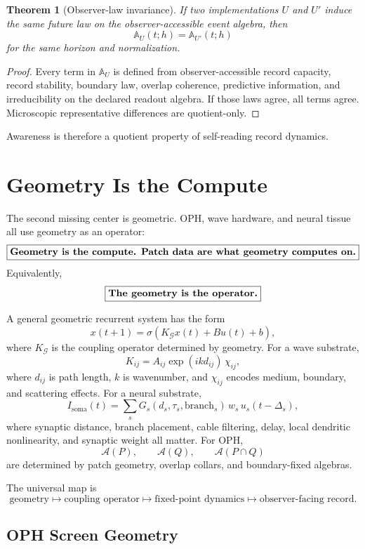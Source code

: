 \documentclass[11pt]{article}
\newtheorem{theorem}{Theorem}[section]
\theoremstyle{remark}
\theoremstyle{plain}
\begin{document}
\begin{theorem}[Observer-law invariance]
If two implementations \(U\) and \(U'\) induce the same future law on the observer-accessible event algebra, then
\[
\mathbb A_U(t;h)=\mathbb A_{U'}(t;h)
\]
for the same horizon and normalization.
\end{theorem}

\begin{proof}
Every term in \(\mathbb A_U\) is defined from observer-accessible record capacity, record stability, boundary law, overlap coherence, predictive information, and irreducibility on the declared readout algebra. If those laws agree, all terms agree. Microscopic representative differences are quotient-only.
\end{proof}

Awareness is therefore a quotient property of self-reading record dynamics.

\section{Geometry Is the Compute}

The second missing center is geometric. OPH, wave hardware, and neural tissue all use geometry as an operator:
\[
\boxed{
\text{\bfseries Geometry is the compute. Patch data are what geometry computes on.}
}
\]
Equivalently,
\[
\boxed{
\text{\bfseries The geometry is the operator.}
}
\]

A general geometric recurrent system has the form
\[
x(t+1)=\sigma\!\left(K_{\mathcal G}x(t)+Bu(t)+b\right),
\]
where \(K_{\mathcal G}\) is the coupling operator determined by geometry. For a wave substrate,
\[
K_{ij}=A_{ij}\exp(i k d_{ij})\,\chi_{ij},
\]
where \(d_{ij}\) is path length, \(k\) is wavenumber, and \(\chi_{ij}\) encodes medium, boundary, and scattering effects. For a neural substrate,
\[
I_{\mathrm{soma}}(t)
=
\sum_s
G_s(d_s,\tau_s,\mathrm{branch}_s)\,
w_s\,
u_s(t-\Delta_s),
\]
where synaptic distance, branch placement, cable filtering, delay, local dendritic nonlinearity, and synaptic weight all matter. For OPH,
\[
\mathcal A(P),\qquad \mathcal A(Q),\qquad \mathcal A(P\cap Q)
\]
are determined by patch geometry, overlap collars, and boundary-fixed algebras.

The universal map is
\[
\boxed{
\text{geometry}
\longmapsto
\text{coupling operator}
\longmapsto
\text{fixed-point dynamics}
\longmapsto
\text{observer-facing record}.
}
\]

\subsection{OPH Screen Geometry}
\end{document}
